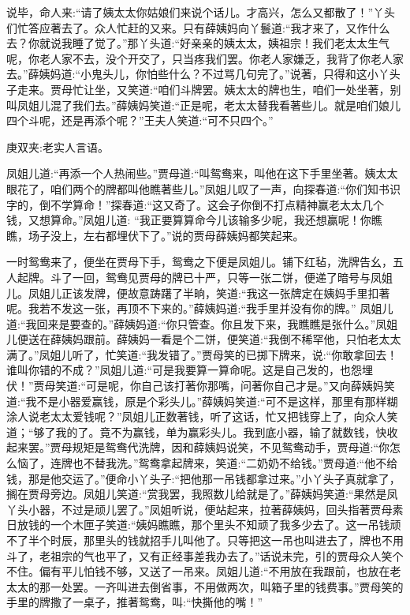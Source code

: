 \begin{parag}
    说毕，命人来:“请了姨太太你姑娘们来说个话儿。才高兴，怎么又都散了！”丫头们忙答应著去了。众人忙赶的又来。只有薛姨妈向丫鬟道:“我才来了，又作什么去？你就说我睡了觉了。”那丫头道:“好亲亲的姨太太，姨祖宗！我们老太太生气呢，你老人家不去，没个开交了，只当疼我们罢。你老人家嫌乏，我背了你老人家去。”薛姨妈道:“小鬼头儿，你怕些什么？不过骂几句完了。”说著，只得和这小丫头子走来。贾母忙让坐，又笑道:“咱们斗牌罢。姨太太的牌也生，咱们一处坐著，别叫凤姐儿混了我们去。”薛姨妈笑道:“正是呢，老太太替我看著些儿。就是咱们娘儿四个斗呢，还是再添个呢？”王夫人笑道:“可不只四个。”\begin{note}庚双夹:老实人言语。\end{note}凤姐儿道:“再添一个人热闹些。”贾母道:“叫鸳鸯来，叫他在这下手里坐著。姨太太眼花了，咱们两个的牌都叫他瞧著些儿。”凤姐儿叹了一声，向探春道:“你们知书识字的，倒不学算命！”探春道:“这又奇了。这会子你倒不打点精神赢老太太几个钱，又想算命。”凤姐儿道: “我正要算算命今儿该输多少呢，我还想赢呢！你瞧瞧，场子没上，左右都埋伏下了。”说的贾母薛姨妈都笑起来。
\end{parag}


\begin{parag}
    一时鸳鸯来了，便坐在贾母下手，鸳鸯之下便是凤姐儿。铺下红毡，洗牌告幺，五人起牌。斗了一回，鸳鸯见贾母的牌已十严，只等一张二饼，便递了暗号与凤姐儿。凤姐儿正该发牌，便故意踌躇了半晌，笑道:“我这一张牌定在姨妈手里扣著呢。我若不发这一张，再顶不下来的。”薛姨妈道:“我手里并没有你的牌。” 凤姐儿道:“我回来是要查的。”薛姨妈道:“你只管查。你且发下来，我瞧瞧是张什么。”凤姐儿便送在薛姨妈跟前。薛姨妈一看是个二饼，便笑道:“我倒不稀罕他，只怕老太太满了。”凤姐儿听了，忙笑道:“我发错了。”贾母笑的已掷下牌来，说:“你敢拿回去！谁叫你错的不成？”凤姐儿道:“可是我要算一算命呢。这是自己发的，也怨埋伏！”贾母笑道:“可是呢，你自己该打著你那嘴，问著你自己才是。”又向薛姨妈笑道:“我不是小器爱赢钱，原是个彩头儿。”薛姨妈笑道:“可不是这样，那里有那样糊涂人说老太太爱钱呢？”凤姐儿正数著钱，听了这话，忙又把钱穿上了，向众人笑道；“够了我的了。竟不为赢钱，单为赢彩头儿。我到底小器，输了就数钱，快收起来罢。”贾母规矩是鸳鸯代洗牌，因和薛姨妈说笑，不见鸳鸯动手，贾母道:“你怎么恼了，连牌也不替我洗。”鸳鸯拿起牌来，笑道:“二奶奶不给钱。”贾母道:“他不给钱，那是他交运了。”便命小丫头子:“把他那一吊钱都拿过来。”小丫头子真就拿了，搁在贾母旁边。凤姐儿笑道:“赏我罢，我照数儿给就是了。”薛姨妈笑道:“果然是凤丫头小器，不过是顽儿罢了。”凤姐听说，便站起来，拉著薛姨妈，回头指著贾母素日放钱的一个木匣子笑道:“姨妈瞧瞧，那个里头不知顽了我多少去了。这一吊钱顽不了半个时辰，那里头的钱就招手儿叫他了。只等把这一吊也叫进去了，牌也不用斗了，老祖宗的气也平了，又有正经事差我办去了。”话说未完，引的贾母众人笑个不住。偏有平儿怕钱不够，又送了一吊来。凤姐儿道:“不用放在我跟前，也放在老太太的那一处罢。一齐叫进去倒省事，不用做两次，叫箱子里的钱费事。”贾母笑的手里的牌撒了一桌子，推著鸳鸯，叫:“快撕他的嘴！”
\end{parag}


